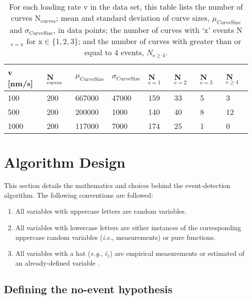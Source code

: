 \begin{table}[htp]
\caption[Data set statistical information]{ For each loading rate v in the data set, this table lists the number of curves N$_{\mathrm{curves}}$; mean and standard deviation of curve sizes, $\mu_{\mathrm{Curve Size}}$ and $\sigma_{\mathrm{Curve Size}}$, in data points; the number of curves with `x' events N$_{\mathrm{e=x}}$ for x$\in\{1,2,3\}$; and the number of curves with greater than or equal to 4 events, $N_{\mathrm{e}\ge4}$. }
\begin{tabularx}{\textwidth}{ l | l | l | l |l |l|l|l }
\hline \hline
v [nm/s] & N$_\mathrm{curves}$ & $\mu_{\mathrm{Curve Size}}$ & $\sigma_{\mathrm{Curve Size}}$ & N$_{\mathrm{e}= 1}$ & N$_{\mathrm{e}= 2}$ & N$_{\mathrm{e}= 3}$ & N$_{\mathrm{e}\ge4}$  \\ \hline
100 & 200 & 667000 & 47000 & 159 & 33 & 5 & 3  \\ \hline
500 & 200 & 200000 & 1000 & 140 & 40 & 8 & 12  \\ \hline
1000 & 200 & 117000 & 7000 & 174 & 25 & 1 & 0  \\ \hline
\end{tabularx}
\end{table}



\chapter{ Algorithm Design}

This section details the mathematics and choices behind the event-detection algorithm. The following conventions are followed:

\begin{enumerate}
 \item All variables with uppercase letters are random variables.
 \item All variables with lowercase letters are either instances of the corresponding uppercase random variables (\textit{i.e.}, measurements) or pure functions.
 \item All variables with a hat (\textit{e.g.}, $\hat{\epsilon}_t$) are empirical measurements or estimated of an already-defined variable .
\end{enumerate}

\section{Defining the no-event hypothesis}

